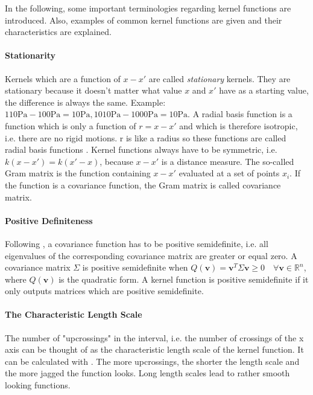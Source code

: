 \documentclass[%
  a4paper,oneside,%
  11pt,%
  smallchapters,
  style=printdev,
  extramargin,
  green,%
  rgb, <cmyk>
  ]{tubsbook}
\begin{document}
In the following, some important terminologies regarding kernel functions are introduced. Also, examples of common kernel functions are given and their characteristics are explained.

\paragraph{Stationarity}
Kernels which are a function of $x-x'$ are called \emph{stationary} kernels. They are stationary because it doesn't matter what value $x$ and $x'$ have as a starting value, the difference is always the same. Example: $110\mathrm{Pa} -100\mathrm{Pa} = 10\mathrm{Pa}, 1010\mathrm{Pa}-1000\mathrm{Pa} = 10\mathrm{Pa}$.
%
A radial basis function is a function which is only a function of $r=x-x'$ and which is therefore isotropic, i.e. there are no rigid motions. r is like a radius so these functions are called radial basis functions \cite[p.80]{rasmussen2006} . 
Kernel functions always have to be symmetric, i.e. $k(x-x') = k(x'-x)$, because $x-x'$ is a distance measure.
The so-called Gram matrix is the function containing $x-x'$ evaluated at a set of points $x_i$. If the function is a covariance function, the Gram matrix is called covariance matrix.


\paragraph{Positive Definiteness} Following \cite[pp. 79, 80]{rasmussen2006}, a covariance function has to be positive semidefinite, i.e. all eigenvalues of the corresponding covariance matrix are greater or equal zero. A covariance matrix $\Sigma$ is positive semidefinite when $Q(\bm{v}) = \bm{v}^T \Sigma \bm{v} \geq 0 \quad \forall \bm{v} \in \mathbb{R}^n$, where $Q(\bm{v})$ is the quadratic form. A kernel function is positive semidefinite if it only outputs matrices which are positive semidefinite. 


\paragraph{The Characteristic Length Scale} The number of "upcrossings" in the interval, i.e. the number of crossings of the x axis can be thought of as the characteristic length scale of the kernel function. It can be calculated with \cite[Eq. 4.3]{rasmussen2006}. The more upcrossings, the shorter the length scale and the more jagged the function looks. Long length scales lead to rather smooth looking functions.
\end{document}
